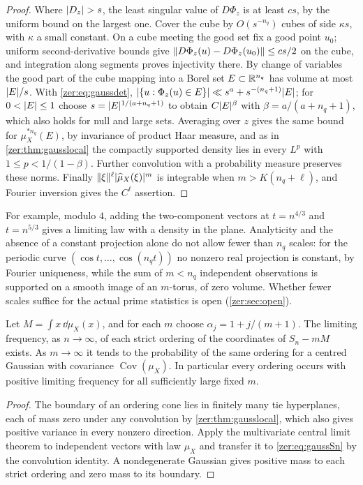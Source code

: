 \begin{proof}
Where $\lvert D_z\rvert>s$, the least singular value of $D\Phi_z$ is at least $cs$, by the uniform bound on
the largest one. Cover the cube by $O(s^{-n_q})$ cubes of side $\kappa s$, with $\kappa$ a small
constant. On a cube meeting the good set fix a good point $u_0$; uniform second-derivative bounds
give $\lVert D\Phi_z(u)-D\Phi_z(u_0)\rVert\le cs/2$ on the cube, and integration along segments proves
injectivity there. By change of variables the good part of the cube mapping into a Borel set
$E\subset\mathbb{R}^{n_q}$ has volume at most $\lvert E\rvert/s$. With \eqref{zer:eq:gaussdet},
$\lvert\{u:\Phi_z(u)\in E\}\rvert\ll s^a+s^{-(n_q+1)}\lvert E\rvert$; for $0<\lvert E\rvert\le1$ choose
$s=\lvert E\rvert^{1/(a+n_q+1)}$ to obtain $C\lvert E\rvert^{\beta}$ with $\beta=a/(a+n_q+1)$, which also holds for
null and large sets. Averaging over $z$ gives the same bound for $\mu_X^{*n_q}(E)$, by invariance of
product Haar measure, and as in \cref{zer:thm:gausslocal} the compactly supported density lies in
every $L^p$ with $1\le p<1/(1-\beta)$. Further convolution with a probability measure preserves these
norms. Finally $\lVert\xi\rVert^\ell\lvert\widehat\mu_X(\xi)\rvert^m$ is integrable when $m>K(n_q+\ell)$, and
Fourier inversion gives the $C^\ell$ assertion.
\end{proof}

For example, modulo $4$, adding the two-component vectors at $t=n^{4/3}$ and $t=n^{5/3}$ gives a
limiting law with a density in the plane. Analyticity and the absence of a constant projection
alone do not allow fewer than $n_q$ scales: for the periodic curve
$(\cos t,\dots,\cos(n_qt))$ no nonzero real projection is constant, by Fourier uniqueness, while the
sum of $m<n_q$ independent observations is supported on a smooth image of an $m$-torus, of zero
volume. Whether fewer scales suffice for the actual prime statistics is open
(\cref{zer:sec:open}).

\begin{corollary}\label{zer:cor:gaussorder}
Let $M=\int x\,\dd\mu_X(x)$, and for each $m$ choose $\alpha_j=1+j/(m+1)$. The limiting frequency, as
$n\to\infty$, of each strict ordering of the coordinates of $S_n-mM$ exists. As $m\to\infty$ it tends
to the probability of the same ordering for a centred Gaussian with covariance $\operatorname{Cov}(\mu_X)$.
In particular every ordering occurs with positive limiting frequency for all sufficiently large
fixed $m$.
\end{corollary}
\begin{proof}
The boundary of an ordering cone lies in finitely many tie hyperplanes, each of mass zero under any
convolution by \cref{zer:thm:gausslocal}, which also gives positive variance in every nonzero
direction. Apply the multivariate central limit theorem to independent vectors with law $\mu_X$ and
transfer it to \eqref{zer:eq:gaussSn} by the convolution identity. A nondegenerate Gaussian gives
positive mass to each strict ordering and zero mass to its boundary.
\end{proof}

